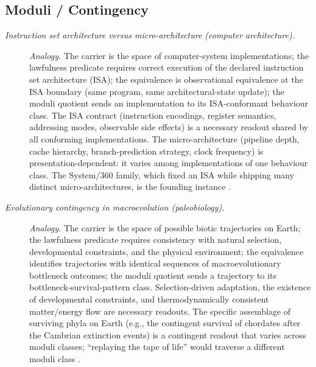 \subsection*{ Moduli / Contingency}
\begingroup\small
\begin{description}
\item[\emph{Instruction set architecture versus
micro-architecture (computer architecture).}] \textit{Analogy.}
The carrier is the space of computer-system
implementations; the lawfulness predicate requires
correct execution of the declared instruction set
architecture (ISA); the equivalence is observational
equivalence at the ISA boundary (same program, same
architectural-state update); the moduli quotient sends
an implementation to its ISA-conformant behaviour
class.  The ISA contract (instruction encodings,
register semantics, addressing modes, observable side
effects) is a necessary readout shared by all
conforming implementations.  The micro-architecture
(pipeline depth, cache hierarchy, branch-prediction
strategy, clock frequency) is presentation-dependent: it
varies among implementations of one behaviour class.  The
System/360 family, which fixed an ISA while shipping
many distinct micro-architectures, is the founding
instance \citep{AmdahlBlaauwBrooks1964System360}.

\item[\emph{Evolutionary contingency in macroevolution
(paleobiology).}] \textit{Analogy.}
The carrier is the space of possible biotic
trajectories on Earth; the lawfulness predicate
requires consistency with natural selection,
developmental constraints, and the physical
environment; the equivalence identifies trajectories
with identical sequences of macroevolutionary
bottleneck outcomes; the moduli quotient sends a
trajectory to its bottleneck-survival-pattern class.
Selection-driven adaptation, the existence of
developmental constraints, and thermodynamically
consistent matter/energy flow are necessary readouts.
The specific assemblage of surviving phyla on Earth
(e.g., the contingent survival of chordates after the
Cambrian extinction events) is a contingent readout
that varies across moduli classes; ``replaying the
tape of life'' would traverse a different moduli class
\citep{Gould1989WonderfulLife}.
\end{description}
\endgroup

